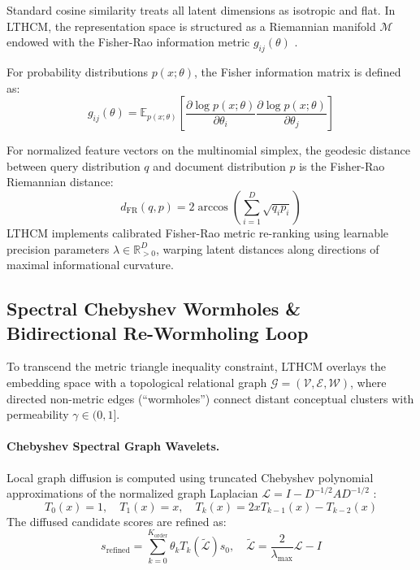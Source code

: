 \documentclass[11pt,a4paper]{article}
\begin{document}
Standard cosine similarity treats all latent dimensions as isotropic and flat. In LTHCM, the representation space is structured as a Riemannian manifold $\mathcal{M}$ endowed with the Fisher-Rao information metric $g_{ij}(\theta)$ \cite{amari2000methods}. 

For probability distributions $p(x; \theta)$, the Fisher information matrix is defined as:
\begin{equation}
    g_{ij}(\theta) = \mathbb{E}_{p(x; \theta)}\left[ \frac{\partial \log p(x; \theta)}{\partial \theta_i} \frac{\partial \log p(x; \theta)}{\partial \theta_j} \right]
\end{equation}

For normalized feature vectors on the multinomial simplex, the geodesic distance between query distribution $q$ and document distribution $p$ is the Fisher-Rao Riemannian distance:
\begin{equation}
    d_{\mathrm{FR}}(q, p) = 2 \arccos\left( \sum_{i=1}^D \sqrt{q_i p_i} \right)
\end{equation}
LTHCM implements calibrated Fisher-Rao metric re-ranking using learnable precision parameters $\lambda \in \mathbb{R}^D_{>0}$, warping latent distances along directions of maximal informational curvature.

\subsection{Spectral Chebyshev Wormholes \& Bidirectional Re-Wormholing Loop}

To transcend the metric triangle inequality constraint, LTHCM overlays the embedding space with a topological relational graph $\mathcal{G} = (\mathcal{V}, \mathcal{E}, \mathcal{W})$, where directed non-metric edges (``wormholes'') connect distant conceptual clusters with permeability $\gamma \in (0, 1]$.

\paragraph{Chebyshev Spectral Graph Wavelets.} Local graph diffusion is computed using truncated Chebyshev polynomial approximations of the normalized graph Laplacian $\mathcal{L} = I - D^{-1/2} A D^{-1/2}$ \cite{hammond2011wavelets}:
\begin{equation}
    T_0(x) = 1, \quad T_1(x) = x, \quad T_k(x) = 2x T_{k-1}(x) - T_{k-2}(x)
\end{equation}
The diffused candidate scores are refined as:
\begin{equation}
    s_{\mathrm{refined}} = \sum_{k=0}^{K_{\mathrm{order}}} \theta_k T_k(\tilde{\mathcal{L}}) s_0, \quad \tilde{\mathcal{L}} = \frac{2}{\lambda_{\max}} \mathcal{L} - I
\end{equation}
\end{document}
